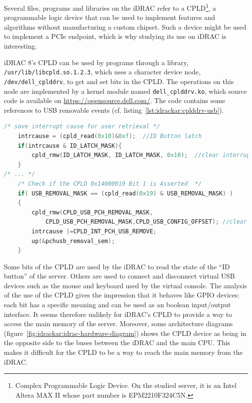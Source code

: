 Several files, programs and libraries on the iDRAC refer to a CPLD\footnote{Complex Programmable Logic Device. On the studied server, it is an Intel Altera MAX II whose part number is EPM2210F324C5N.}, a programmable logic device that can be used to implement features and algorithms without manufacturing a custom chipset.
Such a device might be used to implement a PCIe endpoint, which is why studying its use on iDRAC is interesting.

iDRAC 8's CPLD can be used by programs through a library, \texttt{/usr/lib/libcpld.so.1.2.3}, which uses a character device node, \texttt{/dev/dell\_cplddrv}, to get and set bits in the CPLD.
The operations on this node are implemented by a kernel module named \texttt{dell\_cplddrv.ko}, which source code is available on \url{https://opensource.dell.com/}.
The code contains some references to USB removable events (cf. listing~\ref{lst:idrackar:cplddrv-usb}).

\begin{lstlisting}[language={C},caption={Extract of the \texttt{cpldisr\_13g} function, from file \texttt{externalsrc/linux-drivers/cpld\_driver/dell\_cplddrv.c}.},label={lst:idrackar:cplddrv-usb}]
    /* save interrupt cause for user retrieval */
    intrcause = (cpld_read(0x10)&0xf);  //ID Button latch
    if(intrcause & ID_LATCH_MASK){
        cpld_rmw(ID_LATCH_MASK, ID_LATCH_MASK, 0x10);  //clear interrupt
    }
/* ... */
    /* Check if the CPLD 0x14000019 Bit 1 is Asserted  */
    if( USB_REMOVAL_MASK == (cpld_read(0x19) & USB_REMOVAL_MASK) )
    {
        cpld_rmw(CPLD_USB_PCH_REMOVAL_MASK,
            CPLD_USB_PCH_REMOVAL_MASK,CPLD_USB_CONFIG_OFFSET); //clear interrupt
        intrcause |=CPLD_INT_PCH_USB_REMOVE;
        up(&pchusb_removal_sem);
    }
\end{lstlisting}

Some bits of the CPLD are used by the iDRAC to read the state of the ``ID button'' of the server.
Others are used to connect and disconnect virtual USB devices such as the mouse and keyboard used by the virtual console.
The analysis of the use of the CPLD gives the impression that it behaves like GPIO devices: each bit has a specific meaning and can be used as an boolean input/output interface.
It seems therefore unlikely for iDRAC's CPLD to provide a way to access the main memory of the server.
Moreover, some architecture diagrams (figure~\ref{fig:idrackar:idrac-hardware-diagram}) shows the CPLD device as being in the opposite side to the buses between the iDRAC and the main CPU.
This makes it difficult for the CPLD to be a way to reach the main memory from the iDRAC.


